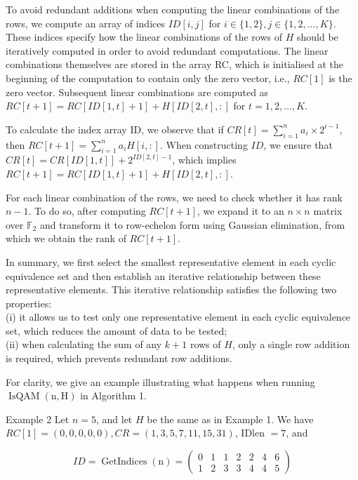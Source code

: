 \documentclass[10pt]{article}
\begin{document}
To avoid redundant additions when computing the linear combinations of the rows, we compute an array of indices $I D[i, j]$ for $i \in\{1,2\}, j \in\{1,2, \ldots, K\}$. These indices specify how the linear combinations of the rows of $H$ should be iteratively computed in order to avoid redundant computations. The linear combinations themselves are stored in the array RC, which is initialised at the beginning of the computation to contain only the zero vector, i.e., $R C[1]$ is the zero vector. Subsequent linear combinations are computed as $R C[t+1]=R C[I D[1, t]+1]+H[I D[2, t],:]$ for $t=1,2, \ldots, K$.

To calculate the index array ID, we observe that if $C R[t]=\sum_{i=1}^{n} a_{i} \times 2^{i-1}$, then $R C[t+1]=\sum_{i=1}^{n} a_{i} H[i,:]$. When constructing $I D$, we ensure that $C R[t]=C R[I D[1, t]]+2^{I D[2, t]-1}$, which implies $R C[t+1]=R C[I D[1, t]+1]+H[I D[2, t],:]$.

For each linear combination of the rows, we need to check whether it has rank $n-1$. To do so, after computing $R C[t+1]$, we expand it to an $n \times n$ matrix over $\mathbb{F}_{2}$ and transform it to row-echelon form using Gaussian elimination, from which we obtain the rank of $R C[t+1]$.

In summary, we first select the smallest representative element in each cyclic equivalence set and then establish an iterative relationship between these representative elements. This iterative relationship satisfies the following two properties:\\
(i) it allows us to test only one representative element in each cyclic equivalence set, which reduces the amount of data to be tested;\\
(ii) when calculating the sum of any $k+1$ rows of $H$, only a single row addition is required, which prevents redundant row additions.

For clarity, we give an example illustrating what happens when running $\operatorname{IsQAM}(\mathrm{n}, \mathrm{H})$ in Algorithm 1.

Example 2 Let $n=5$, and let $H$ be the same as in Example 1. We have $R C[1]=(0,0,0,0,0), C R=(1,3,5,7,11,15,31)$, IDlen $=7$, and

$$
I D=\operatorname{GetIndices}(\mathrm{n})=\left(\begin{array}{ccccccc}
0 & 1 & 1 & 2 & 2 & 4 & 6 \\
1 & 2 & 3 & 3 & 4 & 4 & 5
\end{array}\right)
$$
\end{document}
